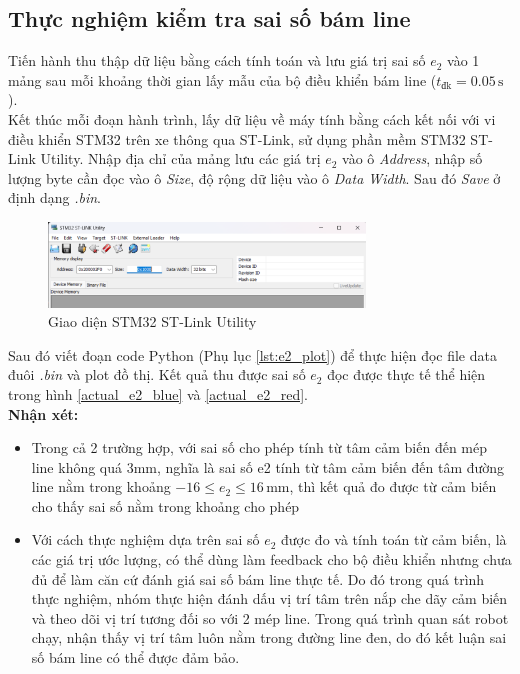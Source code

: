           \subsection{Thực nghiệm kiểm tra sai số bám line}
               \hspace*{0.6cm}Tiến hành thu thập dữ liệu bằng cách tính toán và lưu giá trị sai số $e_2$ vào 1 mảng sau mỗi khoảng thời gian lấy mẫu của bộ điều khiển bám line ($t_{\text{đk}} = 0.05 \,\mathrm{s}$).\\
               \hspace*{0.6cm}Kết thúc mỗi đoạn hành trình, lấy dữ liệu về máy tính bằng cách kết nối với vi điều khiển STM32 trên xe thông qua ST-Link, sử dụng phần mềm STM32 ST-Link Utility. Nhập địa chỉ của mảng lưu các giá trị $e_2$ vào ô \textit{Address}, nhập số lượng byte cần đọc vào ô \textit{Size}, độ rộng dữ liệu vào ô \textit{Data Width}. Sau đó \textit{Save} ở định dạng \textit{.bin}.
               \begin{figure}[H]
                    \centering
                    \includegraphics[width=0.75\textwidth]{pictures/chapter8/utility.png}
                    \caption{Giao diện STM32 ST-Link Utility}
                    \label{utility}
               \end{figure}
               Sau đó viết đoạn code Python (Phụ lục \ref{lst:e2_plot}) để thực hiện đọc file data đuôi \textit{.bin} và plot đồ thị. Kết quả thu được sai số $e_2$ đọc được thực tế thể hiện trong hình \ref{actual_e2_blue} và \ref{actual_e2_red}.\\[0.2cm]
               \hspace*{0.6cm}\textbf{Nhận xét:}
               \begin{itemize}
                    \item Trong cả 2 trường hợp, với sai số cho phép tính từ tâm cảm biến đến mép line không quá 3mm, nghĩa là sai số e2 tính từ tâm cảm biến đến tâm đường line nằm trong khoảng $-16 \leq e_2 \leq 16 \,\mathrm{mm}$, thì kết quả đo được từ cảm biến cho thấy sai số nằm trong khoảng cho phép
                    \item Với cách thực nghiệm dựa trên sai số $e_2$ được đo và tính toán từ cảm biến, là các giá trị ước lượng, có thể dùng làm feedback cho bộ điều khiển nhưng chưa đủ để làm căn cứ đánh giá sai số bám line thực tế. Do 
                    đó trong quá trình thực nghiệm, nhóm thực hiện đánh dấu vị trí tâm trên nắp che dãy cảm biến và theo dõi vị trí tương đối so với 2 mép line. Trong quá trình quan sát robot chạy, nhận thấy vị trí tâm luôn nằm trong đường line đen, do đó kết luận sai số bám line có thể được đảm bảo.
               \end{itemize}
